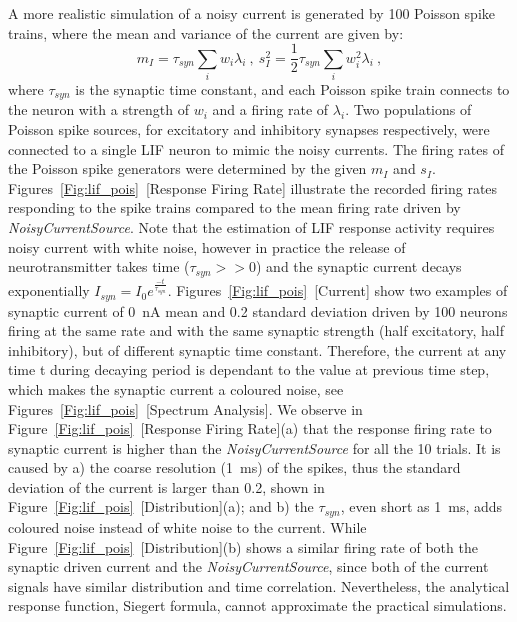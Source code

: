	A more realistic simulation of a noisy current is generated by 100 Poisson spike trains, 
	where the mean and variance of the current are given by:
	\begin{equation}
	m_I = \tau_{syn}\sum_i w_i\lambda_{i}~, ~s_I^2=\frac{1}{2}\tau_{syn}\sum_i w_i^2\lambda_{i}~,
	\label{equ:distr}
	\end{equation}
	where $\tau_{syn}$ is the synaptic time constant, and each Poisson spike train connects to the neuron with a strength of $w_i$ and a firing rate of $\lambda_i$.
	Two populations of Poisson spike sources, for excitatory and inhibitory synapses respectively, were connected to a single LIF neuron to mimic the noisy currents.
	The firing rates of the Poisson spike generators were determined by the given $m_I$ and $s_I$.
	Figures~\ref{Fig:lif_pois}~[Response Firing Rate] illustrate the recorded firing rates responding to the spike trains compared to the mean firing rate driven by \textit{NoisyCurrentSource}.
	Note that the estimation of LIF response activity requires noisy current with white noise, however
	in practice the release of neurotransmitter takes time ($\tau_{syn} >> 0$) and the synaptic current decays exponentially $I_{syn} = I_0 e^{\frac{-t}{\tau_{syn}}}$.
	Figures~\ref{Fig:lif_pois}~[Current] show two examples of synaptic current of 0~nA mean and 0.2 standard deviation driven by 100 neurons firing at the same rate and with the same synaptic strength (half excitatory, half inhibitory), but of different synaptic time constant.
	Therefore, the current at any time t during decaying period is dependant to the value at previous time step, which makes the synaptic current a coloured noise, see Figures~\ref{Fig:lif_pois}~[Spectrum Analysis].
	We observe in Figure~\ref{Fig:lif_pois}~[Response Firing Rate](a) that the response firing rate to synaptic current is higher than the \textit{NoisyCurrentSource} for all the 10 trials.
	It is caused by a) the coarse resolution (1~ms) of the spikes, thus the standard deviation of the current is larger than 0.2, shown in Figure~\ref{Fig:lif_pois}~[Distribution](a);
	and b) the $\tau_{syn}$, even short as 1~ms, adds coloured noise instead of white noise to the current.
	While Figure~\ref{Fig:lif_pois}~[Distribution](b) shows a similar firing rate of both the synaptic driven current and the \textit{NoisyCurrentSource}, since both of the current signals have similar distribution and time correlation.
	Nevertheless, the analytical response function, Siegert formula, cannot approximate the practical simulations.
	
